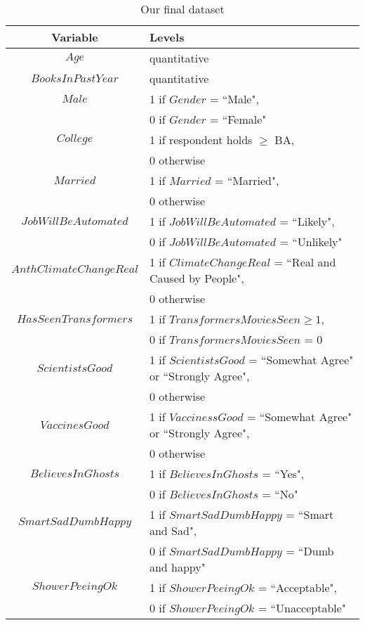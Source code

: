 \begin{table}[h]
    \centering
    \begin{tabular}{|c|l|}
        \hline
        \textbf{Variable} & \textbf{Levels} \\
        \hline
        \hline
        $Age$ & quantitative\\
        \hline        $BooksInPastYear$ & quantitative\\
        \hline
        \hline
        $Male$ & 1 if $Gender$ = ``Male",\\
        & 0 if $Gender$ = ``Female"\\
        \hline
        $College$ & 1 if respondent holds $\ge$ BA,\\
        & 0 otherwise\\
        \hline
        $Married$ & 1 if $Married$ = ``Married",\\
        & 0 otherwise\\
        \hline
        $JobWillBeAutomated$ & 1 if $JobWillBeAutomated$ = ``Likely",\\
        & 0 if $JobWillBeAutomated$ = ``Unlikely"\\
        \hline
        $AnthClimateChangeReal$ & 1 if $ClimateChangeReal$ = ``Real and Caused by People",\\
        & 0 otherwise\\
        \hline
        $HasSeenTransformers$ & 1 if $TransformersMoviesSeen \ge 1$,\\
        & 0 if $TransformersMoviesSeen$ = 0\\
        \hline
        $ScientistsGood$ & 1 if $ScientistsGood$ = ``Somewhat Agree" or ``Strongly Agree",\\
        & 0 otherwise\\
        \hline
        $VaccinesGood$ & 1 if $VaccinessGood$ = ``Somewhat Agree" or ``Strongly Agree",\\
        & 0 otherwise\\
        \hline
        $BelievesInGhosts$ & 1 if $BelievesInGhosts$ = ``Yes",\\
        & 0 if $BelievesInGhosts$ = ``No"\\
        \hline
        $SmartSadDumbHappy$ & 1 if $SmartSadDumbHappy$ = ``Smart and Sad",\\
        & 0 if $SmartSadDumbHappy$ = ``Dumb and happy"\\
        \hline
        $ShowerPeeingOk$ & 1 if $ShowerPeeingOk$ = ``Acceptable",\\
        & 0 if $ShowerPeeingOk$ = ``Unacceptable"\\
        \hline
    \end{tabular}
    \caption{Our final dataset}
    \label{tab:data_trimmed}
\end{table}


